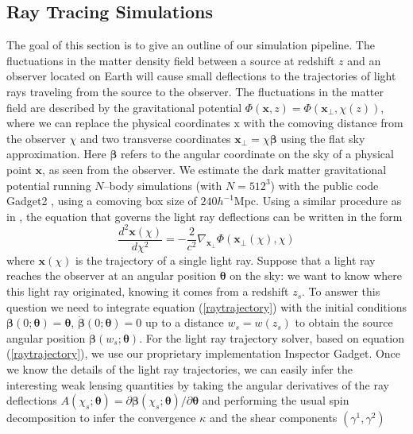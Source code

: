 \documentclass[reprint,aps,prd,superscriptaddress,showkeys,showpacs]{revtex4-1}
\begin{document}
\subsection{Ray Tracing Simulations}
\label{raysim}
The goal of this section is to give an outline of our simulation pipeline. 
The fluctuations in the matter density field between a source at redshift $z$ and an observer located on Earth will cause small deflections to the trajectories of light rays traveling from the source to the observer. The fluctuations in the matter field are described by the gravitational potential $\Phi(\mathbf{x},z)=\Phi(\mathbf{x}_\perp,\chi(z))$, where we can replace the physical coordinates $\mathrm{x}$ with the comoving distance from the observer $\chi$ and two transverse coordinates $\mathbf{x}_\perp=\chi\pmb{\beta}$ using the flat sky approximation. Here $\pmb{\beta}$ refers to the angular coordinate on the sky of a physical point $\mathbf{x}$, as seen from the observer. We estimate the dark matter gravitational potential running $N$--body simulations (with $N=512^3$) with the public code Gadget2 \citep{Gadget2}, using a comoving box size of $240h^{-1}$Mpc. Using a similar procedure as in \citep{RayTracingJain,RayTracingHartlap}, the equation that governs the light ray deflections can be written in the form
\begin{equation}
\label{raytrajectory}
\frac{d^2\mathbf{x}(\chi)}{d\chi^2} = -\frac{2}{c^2}\nabla_{\mathbf{x}_\perp}\Phi(\mathbf{x}_\perp(\chi),\chi)
\end{equation}
%
where $\mathbf{x}(\chi)$ is the trajectory of a single light ray. Suppose that a light ray reaches the observer at an angular position $\pmb{\theta}$ on the sky: we want to know where this light ray originated, knowing it comes from a redshift $z_s$. To answer this question we need to integrate equation (\ref{raytrajectory}) with the initial conditions $\pmb{\beta}(0;\pmb{\theta})=\pmb{\theta}$, $\dot{\pmb{\beta}}(0;\pmb{\theta})=0$ up to a distance $w_s=w(z_s)$ to obtain the source angular position $\pmb{\beta}(w_s;\pmb{\theta})$. For the light ray trajectory solver, based on equation (\ref{raytrajectory}), we use our proprietary implementation Inspector Gadget. Once we know the details of the light ray trajectories, we can easily infer the interesting weak lensing  quantities by taking the angular derivatives of the ray deflections $A(\chi_s;\pmb{\theta}) = \partial \pmb{\beta}(\chi_s;\pmb{\theta})/\partial\pmb{\theta}$ and performing the usual spin decomposition to infer the convergence $\kappa$ and the shear components $(\gamma^1,\gamma^2)$
\end{document}
